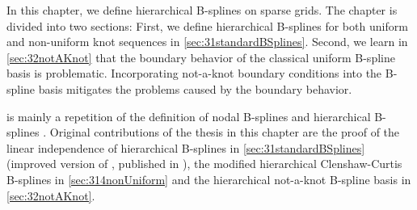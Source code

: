 In this chapter, we define hierarchical B-splines on sparse grids.
The chapter is divided into two sections:
First, we define hierarchical B-splines for both
uniform and non-uniform knot sequences in \cref{sec:31standardBSplines}.
Second, we learn in \cref{sec:32notAKnot} that the boundary behavior
of the classical uniform B-spline basis is problematic.
Incorporating not-a-knot boundary conditions into the B-spline basis
mitigates the problems caused by the boundary behavior.

 is mainly a repetition of the definition
of nodal B-splines \cite{Hoellig03Finite,Hoellig13Approximation} and
hierarchical B-splines \cite{Pflueger10Spatially,Valentin14Hierarchische}.
Original contributions of the thesis in this chapter are the proof of
the linear independence of hierarchical B-splines in
\cref{sec:31standardBSplines}
(improved version of \cite{Valentin14Hierarchische},
published in \cite{Valentin16Hierarchical}),
the modified hierarchical Clenshaw-Curtis B-splines in
\cref{sec:314nonUniform} and
the hierarchical not-a-knot B-spline basis in \cref{sec:32notAKnot}.






\cleardoublepage
